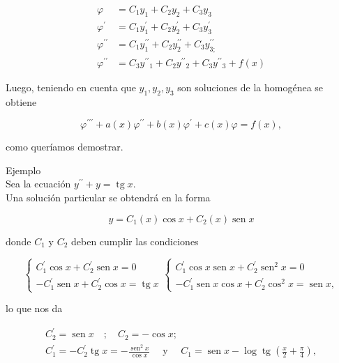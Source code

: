 \documentclass[10pt]{article}
\theoremstyle{plain}
\theoremstyle{definition}
\theoremstyle{remark}
\begin{document}
$$
\begin{aligned}
\varphi & =C_{1} y_{1}+C_{2} y_{2}+C_{3} y_{3} \\
\varphi^{\prime} & =C_{1} y_{1}^{\prime}+C_{2} y_{2}^{\prime}+C_{3} y_{3}^{\prime} \\
\varphi^{\prime \prime} & =C_{1} y_{1}^{\prime \prime}+C_{2} y_{2}^{\prime \prime}+C_{3} y_{3 ;}^{\prime \prime} \\
\varphi^{\prime \prime} & =C_{3} y^{\prime \prime}{ }_{1}+C_{2} y^{\prime \prime}{ }_{2}+C_{3} y^{\prime \prime}{ }_{3}+f(x)
\end{aligned}
$$

Luego, teniendo en cuenta que $y_{1}, y_{2}, y_{3}$ son soluciones de la homogénea se obtiene

$$
\varphi^{\prime \prime \prime}+a(x) \varphi^{\prime \prime}+b(x) \varphi^{\prime}+c(x) \varphi=f(x),
$$

como queríamos demostrar.

Ejemplo\\
Sea la ecuación $y^{\prime \prime}+y=\operatorname{tg} x$.\\
Una solución particular se obtendrá en la forma

$$
y=C_{1}(x) \cos x+C_{2}(x) \operatorname{sen} x
$$

donde $C_{1}$ y $C_{2}$ deben cumplir las condiciones

$$
\left\{\begin{array} { c } 
{ C _ { 1 } ^ { \prime } \operatorname { c o s } x + C _ { 2 } ^ { \prime } \operatorname { s e n } x = 0 } \\
{ - C _ { 1 } ^ { \prime } \operatorname { s e n } x + C _ { 2 } ^ { \prime } \operatorname { c o s } x = \operatorname { t g } x }
\end{array} \left\{\begin{array}{c}
C_{1}^{\prime} \cos x \operatorname{sen} x+C_{2}^{\prime} \operatorname{sen}^{2} x=0 \\
-C_{1}^{\prime} \operatorname{sen} x \cos x+C_{2}^{\prime} \cos ^{2} x=\operatorname{sen} x,
\end{array}\right.\right.
$$

lo que nos da

$$
\begin{gathered}
C_{2}^{\prime}=\operatorname{sen} x \quad ; \quad C_{2}=-\cos x ; \\
C_{1}^{\prime}=-C_{2}^{\prime} \operatorname{tg} x=-\frac{\operatorname{sen}^{2} x}{\cos x} \quad \text { y } \quad C_{1}=\operatorname{sen} x-\log \operatorname{tg}\left(\frac{x}{2}+\frac{\pi}{4}\right),
\end{gathered}
$$
\end{document}
